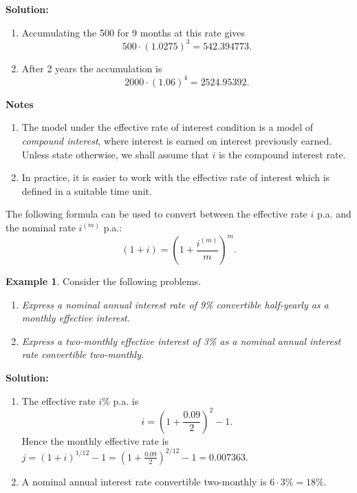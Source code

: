 \documentclass[
]{book}
\theoremstyle{definition}
\theoremstyle{definition}
\newtheorem{example}{Example}[chapter]
\theoremstyle{definition}
\theoremstyle{definition}
\theoremstyle{remark}
\begin{document}
\textbf{Solution:}

\begin{enumerate}
\def\labelenumi{\arabic{enumi}.}
\item
  Accumulating the 500 for 9 months at this rate gives
  \[500 \cdot (1.0275)^3 = 542.394773.\]
\item
  After 2 years the accumulation is
  \[2000 \cdot (1.06)^4 = 2524.95392.\]
\end{enumerate}

\textbf{Notes}

\begin{enumerate}
\def\labelenumi{\arabic{enumi}.}
\item
  The model under the effective rate of interest condition is a
  model of \emph{compound interest}, where interest is earned on interest
  previously earned. Unless state otherwise, we shall assume that \(i\) is
  the compound interest rate.
\item
  In practice, it is easier to work with the effective rate of
  interest which is defined in a suitable time unit.
\end{enumerate}

The following formula can be used to convert between the effective rate
\(i\) p.a. and the nominal rate \(i^{(m)}\) p.a.:
\[( 1 + i) = \left( 1 + \frac{i^{(m)}}{m}\right)^m.\]

\begin{example}

Consider the following problems.

\begin{enumerate}
\def\labelenumi{\arabic{enumi}.}
\item
  \emph{Express a nominal annual interest rate of 9\% convertible
  half-yearly as a monthly effective interest.}
\item
  \emph{Express a two-monthly effective interest of 3\% as a nominal annual
  interest rate convertible two-monthly.}
\end{enumerate}

\end{example}

\textbf{Solution:}

\begin{enumerate}
\def\labelenumi{\arabic{enumi}.}
\item
  The effective rate \(i\)\% p.a. is \[i = ( 1 + \frac{0.09}{2})^2 - 1.\]
  Hence the monthly effective rate is
  \(j = (1 + i)^{1/12} - 1 = ( 1 + \frac{0.09}{2})^{2/12} - 1 = 0.007363\).
\item
  A nominal annual interest rate convertible two-monthly is
  \(6 \cdot 3\% = 18\%\).
\end{enumerate}
\end{document}
